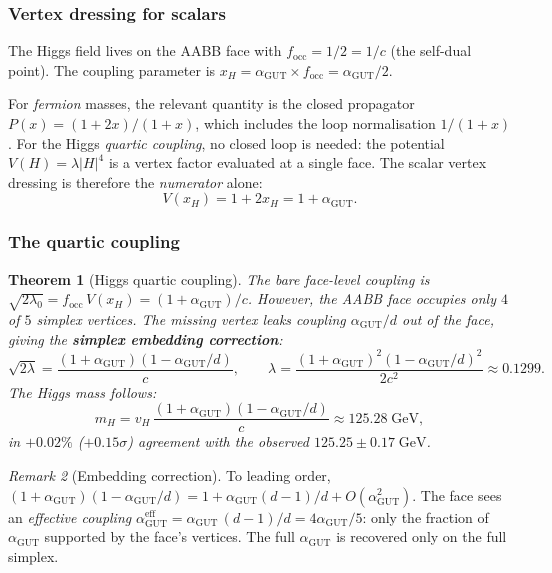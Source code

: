 \documentclass[12pt]{article}
\newtheorem{theorem}{Theorem}[section]
\theoremstyle{remark}
\newtheorem{remark}[theorem]{Remark}
\theoremstyle{definition}
\newcommand{\agut}{\alpha_{\mathrm{GUT}}}
\begin{document}
\subsubsection{Vertex dressing for scalars}

The Higgs field lives on the AABB face with $f_\mathrm{occ} = 1/2 = 1/c$ (the self-dual point).  The coupling parameter is $x_H = \agut \times f_\mathrm{occ} = \agut/2$.

For \emph{fermion} masses, the relevant quantity is the closed propagator $P(x) = (1+2x)/(1+x)$, which includes the loop normalisation $1/(1+x)$.  For the Higgs \emph{quartic coupling}, no closed loop is needed: the potential $V(H) = \lambda|H|^4$ is a vertex factor evaluated at a single face.  The scalar vertex dressing is therefore the \emph{numerator} alone:
\begin{equation}
V(x_H) = 1 + 2x_H = 1 + \agut.
\end{equation}

\subsubsection{The quartic coupling}

\begin{theorem}[Higgs quartic coupling]
\label{thm:higgs_quartic}
The bare face-level coupling is $\sqrt{2\lambda_0} = f_\mathrm{occ}\,V(x_H) = (1+\agut)/c$.  However, the AABB face occupies only $4$ of $5$ simplex vertices.  The missing vertex leaks coupling $\agut/d$ out of the face, giving the \textbf{simplex embedding correction}:
\begin{equation}
\boxed{\sqrt{2\lambda} = \frac{(1 + \agut)(1 - \agut/d)}{c},
\qquad
\lambda = \frac{(1 + \agut)^2(1 - \agut/d)^2}{2c^2} \approx 0.1299.}
\end{equation}
The Higgs mass follows:
\begin{equation}
m_H = v_H\,\frac{(1+\agut)(1-\agut/d)}{c} \approx 125.28\;\mathrm{GeV},
\end{equation}
in $+0.02\%$ ($+0.15\sigma$) agreement with the observed $125.25 \pm 0.17\;\mathrm{GeV}$.
\end{theorem}

\begin{remark}[Embedding correction]
To leading order, $(1+\agut)(1-\agut/d) = 1 + \agut(d-1)/d + O(\agut^2)$.  The face sees an \emph{effective coupling} $\agut^\mathrm{eff} = \agut\,(d-1)/d = 4\agut/5$: only the fraction of $\agut$ supported by the face's vertices.  The full $\agut$ is recovered only on the full simplex.
\end{remark}
\end{document}
